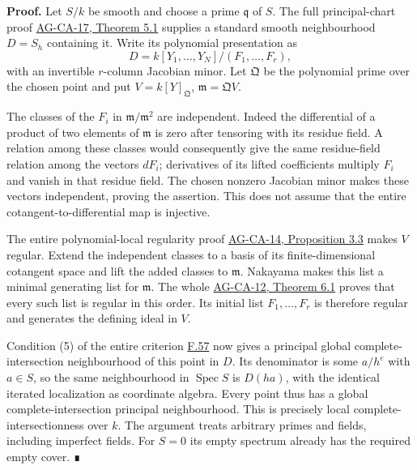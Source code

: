 \documentclass[11pt,a4paper,openany]{report}
\begin{document}
\textbf{Proof.} Let \(S/k\) be smooth and choose a prime \(\mathfrak q\) of \(S\). The full principal-chart proof \href{https://github.com/KokunoYumeto/open-math-courses/blob/d02d0a3669f42579db037cd44de1d113fdd770a1/docs/courses/AG-CA/src/formally-smooth-unramified-and-etale-ring-maps.md}{AG-CA-17, Theorem 5.1} supplies a standard smooth neighbourhood \(D=S_h\) containing it. Write its polynomial presentation as \[D=k[Y_1,\ldots,Y_N]/(F_1,\ldots,F_r),\] with an invertible \(r\)-column Jacobian minor. Let \(\mathfrak Q\) be the polynomial prime over the chosen point and put \(V=k[Y]_{\mathfrak Q}\), \(\mathfrak m=\mathfrak QV\).

The classes of the \(F_i\) in \(\mathfrak m/\mathfrak m^2\) are independent. Indeed the differential of a product of two elements of \(\mathfrak m\) is zero after tensoring with its residue field. A relation among these classes would consequently give the same residue-field relation among the vectors \(dF_i\); derivatives of its lifted coefficients multiply \(F_i\) and vanish in that residue field. The chosen nonzero Jacobian minor makes these vectors independent, proving the assertion. This does not assume that the entire cotangent-to-differential map is injective.

The entire polynomial-local regularity proof \href{https://github.com/KokunoYumeto/open-math-courses/blob/d02d0a3669f42579db037cd44de1d113fdd770a1/docs/courses/AG-CA/src/regular-local-rings.md}{AG-CA-14, Proposition 3.3} makes \(V\) regular. Extend the independent classes to a basis of its finite-dimensional cotangent space and lift the added classes to \(\mathfrak m\). Nakayama makes this list a minimal generating list for \(\mathfrak m\). The whole \href{https://github.com/KokunoYumeto/open-math-courses/blob/d02d0a3669f42579db037cd44de1d113fdd770a1/docs/courses/AG-CA/src/regular-sequences-depth-and-cohen-macaulay-modules.md}{AG-CA-12, Theorem 6.1} proves that every such list is regular in this order. Its initial list \(F_1,\ldots,F_r\) is therefore regular and generates the defining ideal in \(V\).

Condition (5) of the entire criterion \hyperref[AG-RG-S05-algebra-lemma-lci]{F.57} now gives a principal global complete-intersection neighbourhood of this point in \(D\). Its denominator is some \(a/h^e\) with \(a\in S\), so the same neighbourhood in \(\operatorname{Spec}S\) is \(D(ha)\), with the identical iterated localization as coordinate algebra. Every point thus has a global complete-intersection principal neighbourhood. This is precisely local complete-intersectionness over \(k\). The argument treats arbitrary primes and fields, including imperfect fields. For \(S=0\) its empty spectrum already has the required empty cover. ∎
\end{document}

